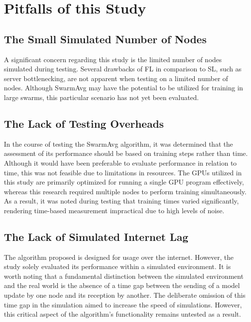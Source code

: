 \section{Pitfalls of this Study}

\subsection{The Small Simulated Number of Nodes}
A significant concern regarding this study is the limited number of nodes simulated during testing. Several drawbacks of FL in comparison to SL, such as server bottlenecking, are not apparent when testing on a limited number of nodes. Although SwarmAvg may have the potential to be utilized for training in large swarms, this particular scenario has not yet been evaluated.

\subsection{The Lack of Testing Overheads}
In the course of testing the SwarmAvg algorithm, it was determined that the assessment of its performance should be based on training steps rather than time. Although it would have been preferable to evaluate performance in relation to time, this was not feasible due to limitations in resources. The GPUs utilized in this study are primarily optimized for running a single GPU program effectively, whereas this research required multiple nodes to perform training simultaneously. As a result, it was noted during testing that training times varied significantly, rendering time-based measurement impractical due to high levels of noise.

\subsection{The Lack of Simulated Internet Lag}
The algorithm proposed is designed for usage over the internet. However, the study solely evaluated its performance within a simulated environment. It is worth noting that a fundamental distinction between the simulated environment and the real world is the absence of a time gap between the sending of a model update by one node and its reception by another. The deliberate omission of this time gap in the simulation aimed to increase the speed of simulations. However, this critical aspect of the algorithm's functionality remains untested as a result.